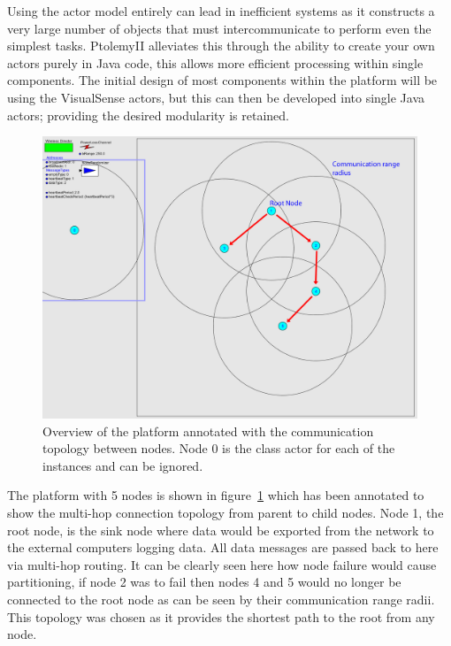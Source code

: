 \documentclass[authoryearcitations]{UoYCSproject}
\begin{document}
Using the actor model entirely can lead in inefficient systems as it constructs a very large number of objects that must intercommunicate to perform even the simplest tasks. PtolemyII alleviates this through the ability to create your own actors purely in Java code, this allows more efficient processing within single components. The initial design of most components within the platform will be using the VisualSense actors, but this can then be developed into single Java actors; providing the desired modularity is retained.

\begin{figure}
 \centering
    \includegraphics[width=\textwidth]{figures/nodeModel.png}
    \caption[Overview of the platform annotated with the communication topology between nodes.]{Overview of the platform annotated with the communication topology between nodes. Node 0 is the class actor for each of the instances and can be ignored.}
    \label{fig:nodeModel}
\end{figure}

The platform with 5 nodes is shown in figure~\ref{fig:nodeModel} which has been annotated to show the multi-hop connection topology from parent to child nodes. Node 1, the root node, is the sink node where data would be exported from the network to the external computers logging data. All data messages are passed back to here via multi-hop routing. It can be clearly seen here how node failure would cause partitioning, if node 2 was to fail then nodes 4 and 5 would no longer be connected to the root node as can be seen by their communication range radii. This topology was chosen as it provides the shortest path to the root from any node.
\end{document}
